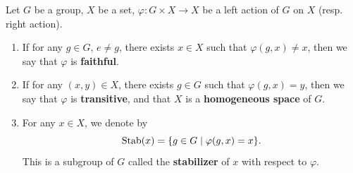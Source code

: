 \begin{definitionenv}
    Let $G$ be a group, $X$ be a set, $\varphi: G \times X \rightarrow X$ be a left action of $G$ on $X$ (resp. right action).
    \begin{enumerate}
        \item If for any $g \in G$, $e \neq g$, there exists $x \in X$ such that $\varphi(g,x) \neq x$,
            then we say that $\varphi$ is \textbf{faithful}.
        \item If for any $(x,y) \in X$, there exists $g \in G$ such that $\varphi(g,x) = y$,
            then we say that $\varphi$ is \textbf{transitive},
            and that $X$ is a \textbf{homogeneous space} of $G$.
        \item For any $x \in X$, we denote by
            $$ \operatorname{\mathrm{Stab}} (x) = \{g \in G \mid \varphi(g,x) = x\}.$$
            This is a subgroup of $G$ called the \textbf{stabilizer} of $x$ with respect to $\varphi$.
    \end{enumerate}
\end{definitionenv}

